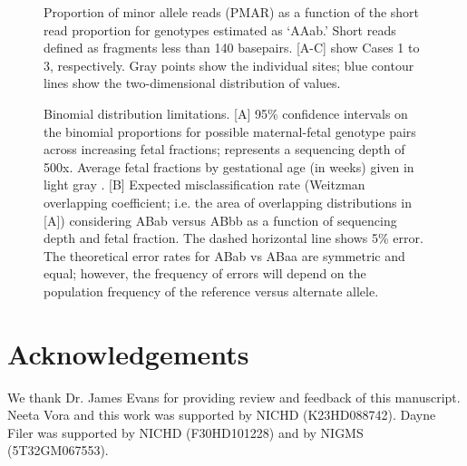 \documentclass{article}\usepackage[]{graphicx}\usepackage[]{color}
\begin{document}
\begin{figure}[h!]
  \centering
  \caption{Proportion of minor allele reads (PMAR) as a function of the short read proportion for genotypes estimated as `AAab.' Short reads defined as fragments less than 140 basepairs. [A-C] show Cases 1 to 3, respectively. Gray points show the individual sites; blue contour lines show the two-dimensional distribution of values.}
  \label{fig:pmarBySratio}
\end{figure}



\begin{figure}[h!]
  \centering
  \caption{Binomial distribution limitations. [A] 95\% confidence intervals on the binomial proportions for possible maternal-fetal genotype pairs across increasing fetal fractions; represents a sequencing depth of 500x. Average fetal fractions by gestational age (in weeks) given in light gray \cite{kinnings:2015aa}. [B] Expected misclassification rate (Weitzman overlapping coefficient; i.e. the area of overlapping distributions in [A]) considering ABab versus ABbb as a function of sequencing depth and fetal fraction. The dashed horizontal line shows 5\% error. The theoretical error rates for ABab vs ABaa are symmetric and equal; however, the frequency of errors will depend on the population frequency of the reference versus alternate allele.}
  \label{fig:binDist}
\end{figure}

\section*{Acknowledgements}
We thank Dr. James Evans for providing review and feedback of this manuscript.
Neeta Vora and this work was supported by NICHD (K23HD088742).
Dayne Filer was supported by NICHD (F30HD101228) and by NIGMS (5T32GM067553).



\end{document}
